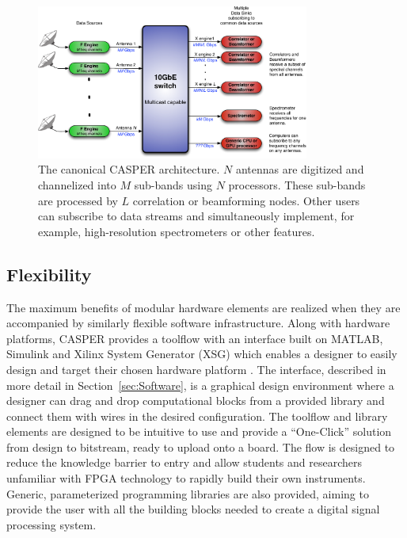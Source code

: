 \documentclass{ws-jai}
\begin{document}
\begin{figure}[htb]
 \centering
 \includegraphics[width=0.8\textwidth]{./figures/ethernet-instrument.pdf}
 \caption{The canonical CASPER architecture. $N$ antennas are digitized and channelized into $M$ sub-bands using $N$ processors. These sub-bands are processed by $L$ correlation or beamforming nodes. Other users can subscribe to data streams and simultaneously implement, for example, high-resolution spectrometers or other features.}
 \label{fig:ethernet-instrument}
\end{figure}



\subsection{Flexibility}

The maximum benefits of modular hardware elements are realized when they are accompanied by similarly flexible software infrastructure. Along with hardware platforms, CASPER provides a toolflow with an interface built on MATLAB, Simulink and Xilinx System Generator (XSG) which enables a designer to easily
design and target their chosen hardware platform \citep{pars05}. The interface, described in more detail in Section~\ref{sec:Software}, 
is a graphical design environment where a designer can drag and
drop computational blocks from a provided library and connect them with wires in the desired configuration.
The toolflow and library elements are designed to be intuitive to use and provide a ``One-Click'' solution from design to
bitstream, ready to upload onto a board. The flow is designed to reduce the knowledge barrier to entry and allow students and researchers unfamiliar with FPGA technology to rapidly build their own instruments.
Generic, parameterized programming libraries are also provided, aiming to provide the user with all the building blocks needed to create a digital signal processing system.
\end{document}

